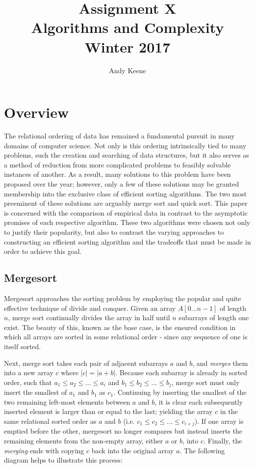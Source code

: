 \documentclass[11pt,letterpaper]{report}
\author{Andy Keene}
\title{Assignment X\\Algorithms and Complexity\\ Winter 2017}
\date{}
\begin{document}
\section*{Overview}
The relational ordering of data has remained a fundamental pursuit in many domains of computer science. Not only is this ordering intrinsically tied to many problems, such the creation and searching of data structures, but it also serves as a method of reduction from more complicated problems to feasibly solvable instances of another. As a result, many solutions to this problem have been proposed over the year; however, only a few of these solutions may be granted membership into the exclusive class of efficient sorting algorithms. The two most preeminent of these solutions are arguably merge sort and quick sort. This paper is concerned with the comparison of empirical data in contrast to the asymptotic promises of each respective algorithm. These two algorithms were chosen not only to justify their popularity, but also to contrast the varying approaches to constructing an efficient sorting algorithm and the tradeoffs that must be made in order to achieve this goal.

\subsection*{Mergesort}			%
Mergesort approaches the sorting problem by employing the popular and quite effective technique of divide and conquer. Given an array $A[0...n-1]$ of length $n$, merge sort continually divides the array in half until $n$ subarrays of length one exist. The beauty of this, known as the base case, is the ensured condition in which all arrays are sorted in some relational order - since any sequence of one is itself sorted. 

Next, merge sort takes each pair of adjacent subarrays $a$ and $b$, and \emph{merges} them into a new array $c$ where $|c|=|a+b|$. Because each subarray is already in sorted order, such that $a_1 \leq a_2 \leq ... \leq a_i$ and $b_1 \leq b_2 \leq ... \leq b_j$, merge sort must only insert the smallest of $a_1$ and $b_1$ as $c_1$. Continuing by inserting the smallest of the two remaining left-most elements between $a$ and $b$, it is clear each subsequently inserted element is larger than or equal to the last; yielding the array $c$ in the same relational sorted order as $a$ and $b$ (i.e. $c_1 \leq c_2 \leq ... \leq c_{i+j}$). If one array is emptied before the other, mergesort no longer compares but instead inserts the remaining elements from the non-empty array, either $a$ or $b$, into $c$.  Finally, the \emph{merging} ends with copying $c$ back into the original array $a$. The following diagram helps to illustrate this process: 
\end{document}

